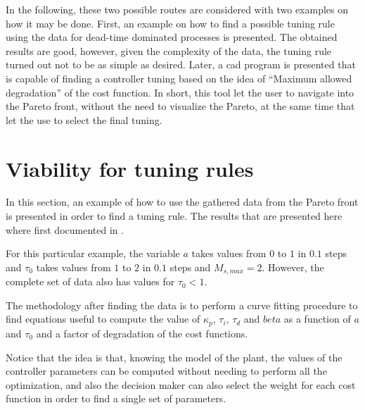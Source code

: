 In the following, these two possible routes are considered with two examples on how it may be done. First, an example on how to find a possible tuning rule using the data for dead-time dominated processes is presented. The obtained results are good, however, given the complexity of the data, the tuning rule turned out not to be as simple as desired. Later, a \gls{cad} program is presented that is capable of finding a controller tuning based on the idea of ``Maximum allowed degradation'' of the cost function. In short, this tool let the user to navigate into the Pareto front, without the need to visualize the Pareto, at the same time that let the use to select the final tuning.

\section{Viability for tuning rules}
\label{sec:TuningRulesMOOP}
In this section, an example of how to use the gathered data from the Pareto front is presented in order to find a tuning rule. The results that are presented here where first documented in \cite{Moya2017}.

For this particular example, the variable $a$ takes values from $0$ to $1$ in $0.1$ steps and $\tau_0$ takes values from $1$ to $2$ in $0.1$ steps and $M_{s,max}=2$. However, the complete set of data also has values for $\tau_0 < 1$.

The methodology after finding the data is to perform a curve fitting procedure to find equations useful to compute the value of $\kappa_p$, $\tau_i$, $\tau_d$ and $beta$ as a function of $a$ and $\tau_0$ and a factor of degradation of the cost functions.

Notice that the idea is that, knowing the model of the plant, the values of the controller parameters can be computed without needing to perform all the optimization, and also the decision maker can also select the weight for each cost function in order to find a single set of parameters.

